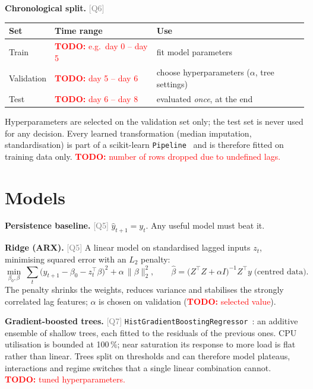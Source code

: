 \documentclass[10pt,a4paper]{article}
\newcommand{\todo}[1]{\textcolor{red}{\textbf{TODO:} #1}}
\newcommand{\q}[1]{\textcolor{gray}{\small[#1]}}
\newcommand{\code}[1]{\texttt{#1}}
\begin{document}
\textbf{Chronological split.} \q{Q6}
\begin{center}\small
\begin{tabular}{lll}
\toprule
Set & Time range & Use \\
\midrule
Train      & \todo{e.g.\ day 0 -- day 5} & fit model parameters \\
Validation & \todo{day 5 -- day 6}      & choose hyperparameters ($\alpha$, tree settings) \\
Test       & \todo{day 6 -- day 8}      & evaluated \emph{once}, at the end \\
\bottomrule
\end{tabular}
\end{center}
Hyperparameters are selected on the validation set only; the test set is never used for any
decision. Every learned transformation (median imputation, standardisation) is part of a
scikit-learn \code{Pipeline}~\cite{sklearn} and is therefore fitted on training data only.
\todo{number of rows dropped due to undefined lags.}

\section{Models}\label{sec:models}
\textbf{Persistence baseline.} \q{Q5}
$\hat y_{t+1} = y_t$. Any useful model must beat it.

\textbf{Ridge (ARX).} \q{Q5}
A linear model on standardised lagged inputs $z_t$, minimising squared error with an $L_2$ penalty:
\begin{equation}
  \min_{\beta_0,\beta}\ \sum_{t}\bigl(y_{t+1} - \beta_0 - z_t^{\top}\beta\bigr)^2 + \alpha\,\lVert\beta\rVert_2^2,
  \qquad
  \hat\beta = \bigl(Z^{\top}Z + \alpha I\bigr)^{-1} Z^{\top} y \;\text{(centred data)}.
\end{equation}
The penalty shrinks the weights, reduces variance and stabilises the strongly correlated lag
features; $\alpha$ is chosen on validation (\todo{selected value}).

\textbf{Gradient-boosted trees.} \q{Q7}
\code{HistGradientBoostingRegressor}~\cite{sklearn}: an additive ensemble of shallow trees, each fitted
to the residuals of the previous ones. CPU utilisation is bounded at 100\,\%; near saturation its
response to more load is flat rather than linear. Trees split on thresholds and can therefore model
plateaus, interactions and regime switches that a single linear combination cannot.
\todo{tuned hyperparameters.}
\end{document}
